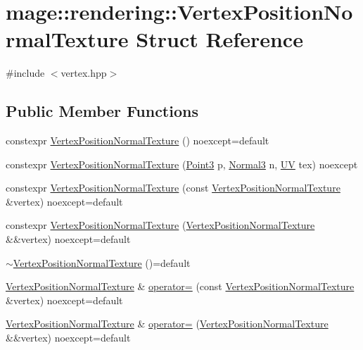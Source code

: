 \hypertarget{structmage_1_1rendering_1_1_vertex_position_normal_texture}{}\section{mage\+:\+:rendering\+:\+:Vertex\+Position\+Normal\+Texture Struct Reference}
\label{structmage_1_1rendering_1_1_vertex_position_normal_texture}


{\ttfamily \#include $<$vertex.\+hpp$>$}

\subsection*{Public Member Functions}
\begin{DoxyCompactItemize}
\item 
constexpr \mbox{\hyperlink{structmage_1_1rendering_1_1_vertex_position_normal_texture_a9ddc1e28f0e4c893d9dca5fa776d68fe}{Vertex\+Position\+Normal\+Texture}} () noexcept=default
\item 
constexpr \mbox{\hyperlink{structmage_1_1rendering_1_1_vertex_position_normal_texture_a7cb8ef7c0852f680e149dc24d8ae3f12}{Vertex\+Position\+Normal\+Texture}} (\mbox{\hyperlink{structmage_1_1_point3}{Point3}} p, \mbox{\hyperlink{structmage_1_1_normal3}{Normal3}} n, \mbox{\hyperlink{structmage_1_1_u_v}{UV}} tex) noexcept
\item 
constexpr \mbox{\hyperlink{structmage_1_1rendering_1_1_vertex_position_normal_texture_adcff35e1a3653f739b68c10ead5c33da}{Vertex\+Position\+Normal\+Texture}} (const \mbox{\hyperlink{structmage_1_1rendering_1_1_vertex_position_normal_texture}{Vertex\+Position\+Normal\+Texture}} \&vertex) noexcept=default
\item 
constexpr \mbox{\hyperlink{structmage_1_1rendering_1_1_vertex_position_normal_texture_a93576bdd7233682f8758a187a6958428}{Vertex\+Position\+Normal\+Texture}} (\mbox{\hyperlink{structmage_1_1rendering_1_1_vertex_position_normal_texture}{Vertex\+Position\+Normal\+Texture}} \&\&vertex) noexcept=default
\item 
\mbox{\hyperlink{structmage_1_1rendering_1_1_vertex_position_normal_texture_ad776aa49c8bb1ec6bb0468eacd85feac}{$\sim$\+Vertex\+Position\+Normal\+Texture}} ()=default
\item 
\mbox{\hyperlink{structmage_1_1rendering_1_1_vertex_position_normal_texture}{Vertex\+Position\+Normal\+Texture}} \& \mbox{\hyperlink{structmage_1_1rendering_1_1_vertex_position_normal_texture_a482076430e7cfa9f1cba373aaa3d1bb4}{operator=}} (const \mbox{\hyperlink{structmage_1_1rendering_1_1_vertex_position_normal_texture}{Vertex\+Position\+Normal\+Texture}} \&vertex) noexcept=default
\item 
\mbox{\hyperlink{structmage_1_1rendering_1_1_vertex_position_normal_texture}{Vertex\+Position\+Normal\+Texture}} \& \mbox{\hyperlink{structmage_1_1rendering_1_1_vertex_position_normal_texture_a54a6a783cc62f078d58c30b2d5922994}{operator=}} (\mbox{\hyperlink{structmage_1_1rendering_1_1_vertex_position_normal_texture}{Vertex\+Position\+Normal\+Texture}} \&\&vertex) noexcept=default
\end{DoxyCompactItemize}
